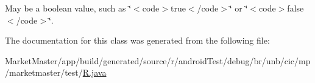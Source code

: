 May be a boolean value, such as \char`\"{}$<$code$>$true$<$/code$>$\char`\"{} or \char`\"{}$<$code$>$false$<$/code$>$\char`\"{}. 

The documentation for this class was generated from the following file\+:\begin{DoxyCompactItemize}
\item 
Market\+Master/app/build/generated/source/r/android\+Test/debug/br/unb/cic/mp/marketmaster/test/\mbox{\hyperlink{androidTest_2debug_2br_2unb_2cic_2mp_2marketmaster_2test_2R_8java}{R.\+java}}\end{DoxyCompactItemize}
